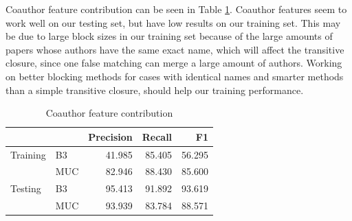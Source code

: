 \documentclass[twocolumn,letterpaper]{article}
\begin{document}
Coauthor feature contribution can be seen in Table \ref{tab:coauthor}. Coauthor features seem to work well on our testing set, but have low results on our training set. This may be due to large block sizes in our training set because of the large amounts of papers whose authors have the same exact name, which will affect the transitive closure, since one false matching can merge a large amount of authors. Working on better blocking methods for cases with identical names and smarter methods than a simple transitive closure, should help our training performance.


\begin{table}[ht]
\centering
\begin{tabular}{l || l | r r r}
 & & Precision & Recall & F1 \\ \hline
Training & B3 & 41.985 & 85.405 & 56.295 \\
 & MUC & 82.946 & 88.430 & 85.600\\ \hline
Testing & B3 & 95.413 & 91.892 & 93.619 \\
 & MUC & 93.939 & 83.784 & 88.571 \\
\end{tabular}
\caption{Coauthor feature contribution}
\label{tab:coauthor}
\end{table}
\end{document}
